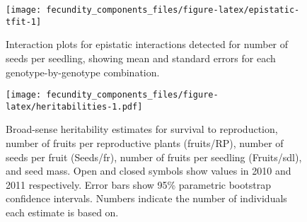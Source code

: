 \documentclass[]{article}
\begin{document}
\newpage

\begin{figure}

{\centering \texttt{[image: fecundity\_components\_files/figure-latex/epistatic-tfit-1]} 

}

\caption[Epistatic interactions for number of seeds/seedling]{Interaction plots for epistatic interactions detected for number of seeds per seedling, showing mean and standard errors for each genotype-by-genotype combination.}\label{fig:epistatic-tfit}
\end{figure}

\newpage

\begin{figure}
\centering
\texttt{[image: fecundity\_components\_files/figure-latex/heritabilities-1.pdf]}
\caption{\label{fig:heritabilities}Broad-sense heritability estimates for survival to reproduction, number of fruits per reproductive plants (fruits/RP), number of seeds per fruit (Seeds/fr), number of fruits per seedling (Fruits/sdl), and seed mass. Open and closed symbols show values in 2010 and 2011 respectively. Error bars show 95\% parametric bootstrap confidence intervals. Numbers indicate the number of individuals each estimate is based on.}
\end{figure}
\end{document}

